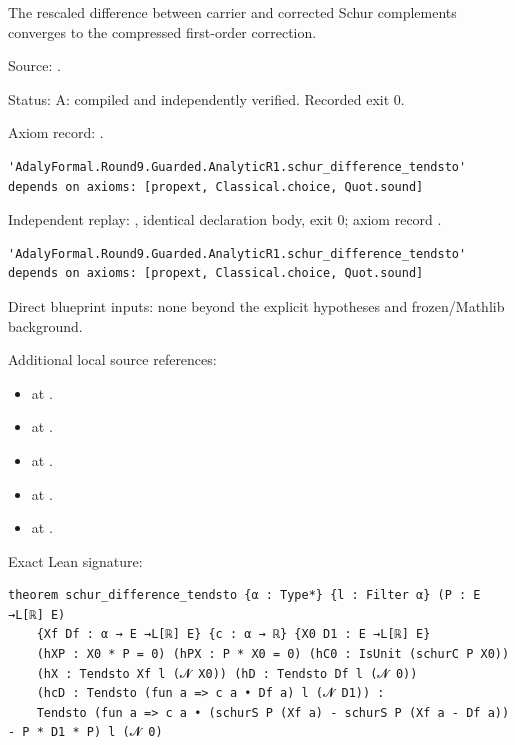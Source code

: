\begin{theorem}[bp-084]
\label{bp-084}
\uses{}
\leanok
The rescaled difference between carrier and corrected Schur complements converges to the compressed first-order correction.

\par Source: \texttt{}.
\par Status: A: compiled and independently verified. Recorded exit 0.
\par Axiom record: \texttt{}.
\begin{verbatim}
'AdalyFormal.Round9.Guarded.AnalyticR1.schur_difference_tendsto' depends on axioms: [propext, Classical.choice, Quot.sound]
\end{verbatim}
\par Independent replay: \texttt{}, identical declaration body, exit 0; axiom record \texttt{}.
\begin{verbatim}
'AdalyFormal.Round9.Guarded.AnalyticR1.schur_difference_tendsto' depends on axioms: [propext, Classical.choice, Quot.sound]
\end{verbatim}
\par Direct blueprint inputs: none beyond the explicit hypotheses and frozen/Mathlib background.
\par Additional local source references:
\begin{itemize}
\item \texttt{} at \texttt{}.
\item \texttt{} at \texttt{}.
\item \texttt{} at \texttt{}.
\item \texttt{} at \texttt{}.
\item \texttt{} at \texttt{}.
\end{itemize}
\par Exact Lean signature:
\begin{verbatim}
theorem schur_difference_tendsto {α : Type*} {l : Filter α} (P : E →L[ℝ] E)
    {Xf Df : α → E →L[ℝ] E} {c : α → ℝ} {X0 D1 : E →L[ℝ] E}
    (hXP : X0 * P = 0) (hPX : P * X0 = 0) (hC0 : IsUnit (schurC P X0))
    (hX : Tendsto Xf l (𝓝 X0)) (hD : Tendsto Df l (𝓝 0))
    (hcD : Tendsto (fun a => c a • Df a) l (𝓝 D1)) :
    Tendsto (fun a => c a • (schurS P (Xf a) - schurS P (Xf a - Df a)) - P * D1 * P) l (𝓝 0)
\end{verbatim}
\end{theorem}

